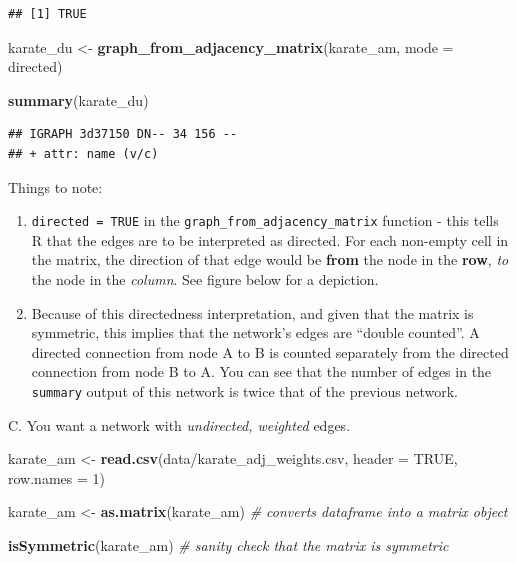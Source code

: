 \documentclass[
]{book}
\newenvironment{Shaded}{\begin{snugshade}}{\end{snugshade}}
\newcommand{\AttributeTok}[1]{\textcolor[rgb]{0.13,0.29,0.53}{#1}}
\newcommand{\CommentTok}[1]{\textcolor[rgb]{0.56,0.35,0.01}{\textit{#1}}}
\newcommand{\ConstantTok}[1]{\textcolor[rgb]{0.56,0.35,0.01}{#1}}
\newcommand{\DecValTok}[1]{\textcolor[rgb]{0.00,0.00,0.81}{#1}}
\newcommand{\FunctionTok}[1]{\textcolor[rgb]{0.13,0.29,0.53}{\textbf{#1}}}
\newcommand{\NormalTok}[1]{#1}
\newcommand{\OtherTok}[1]{\textcolor[rgb]{0.56,0.35,0.01}{#1}}
\newcommand{\StringTok}[1]{\textcolor[rgb]{0.31,0.60,0.02}{#1}}
\providecommand{\tightlist}{%
  \setlength{\itemsep}{0pt}\setlength{\parskip}{0pt}}
\begin{document}
\begin{verbatim}
## [1] TRUE
\end{verbatim}

\begin{Shaded}
\begin{Highlighting}[]
\NormalTok{karate\_du }\OtherTok{\textless{}{-}} \FunctionTok{graph\_from\_adjacency\_matrix}\NormalTok{(karate\_am, }\AttributeTok{mode =} \StringTok{\textquotesingle{}directed\textquotesingle{}}\NormalTok{)}

\FunctionTok{summary}\NormalTok{(karate\_du)}
\end{Highlighting}
\end{Shaded}

\begin{verbatim}
## IGRAPH 3d37150 DN-- 34 156 -- 
## + attr: name (v/c)
\end{verbatim}

Things to note:

\begin{enumerate}
\def\labelenumi{\arabic{enumi}.}
\tightlist
\item
  \texttt{directed\ =\ TRUE} in the \texttt{graph\_from\_adjacency\_matrix} function - this tells R that the edges are to be interpreted as directed. For each non-empty cell in the matrix, the direction of that edge would be \textbf{from} the node in the \textbf{row}, \emph{to} the node in the \emph{column}. See figure below for a depiction.
\item
  Because of this directedness interpretation, and given that the matrix is symmetric, this implies that the network's edges are ``double counted''. A directed connection from node A to B is counted separately from the directed connection from node B to A. You can see that the number of edges in the \texttt{summary} output of this network is twice that of the previous network.
\end{enumerate}

C. You want a network with \emph{undirected, weighted} edges.

\begin{Shaded}
\begin{Highlighting}[]
\NormalTok{karate\_am }\OtherTok{\textless{}{-}} \FunctionTok{read.csv}\NormalTok{(}\StringTok{\textquotesingle{}data/karate\_adj\_weights.csv\textquotesingle{}}\NormalTok{, }\AttributeTok{header =} \ConstantTok{TRUE}\NormalTok{, }\AttributeTok{row.names =} \DecValTok{1}\NormalTok{)}

\NormalTok{karate\_am }\OtherTok{\textless{}{-}} \FunctionTok{as.matrix}\NormalTok{(karate\_am) }\CommentTok{\# converts dataframe into a matrix object}

\FunctionTok{isSymmetric}\NormalTok{(karate\_am) }\CommentTok{\# sanity check that the matrix is symmetric }
\end{Highlighting}
\end{Shaded}
\end{document}
